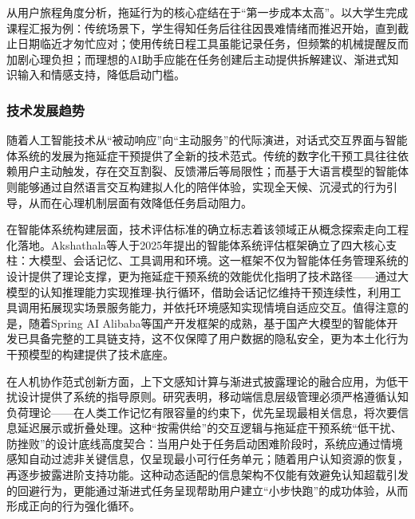 \par 从用户旅程角度分析，拖延行为的核心症结在于“第一步成本太高”\cite{klingsieck2013procrastination}。以大学生完成课程汇报为例：传统场景下，学生得知任务后往往因畏难情绪而推迟开始，直到截止日期临近才匆忙应对；使用传统日程工具虽能记录任务，但频繁的机械提醒反而加剧心理负担；而理想的AI助手应能在任务创建后主动提供拆解建议、渐进式知识输入和情感支持，降低启动门槛。

\subsubsection{技术发展趋势}

\par 随着人工智能技术从“被动响应”向“主动服务”的代际演进\cite{luo2025large}，对话式交互界面与智能体系统的发展为拖延症干预提供了全新的技术范式。传统的数字化干预工具往往依赖用户主动触发，存在交互割裂、反馈滞后等局限性；而基于大语言模型的智能体则能够通过自然语言交互构建拟人化的陪伴体验，实现全天候、沉浸式的行为引导，从而在心理机制层面有效降低任务启动阻力。

\par 在智能体系统构建层面，技术评估标准的确立标志着该领域正从概念探索走向工程化落地。Akshathala等人于2025年提出的智能体系统评估框架确立了四大核心支柱：大模型、会话记忆、工具调用和环境\cite{akshathala2025taskcompletionassessmentframework}。这一框架不仅为智能体任务管理系统的设计提供了理论支撑，更为拖延症干预系统的效能优化指明了技术路径——通过大模型的认知推理能力实现推理-执行循环\cite{yao2022react}，借助会话记忆维持干预连续性，利用工具调用拓展现实场景服务能力，并依托环境感知实现情境自适应交互。值得注意的是，随着Spring AI Alibaba\cite{spring_ai_alibaba}等国产开发框架的成熟，基于国产大模型\cite{liu2024deepseek}\cite{bai2023qwen}的智能体开发已具备完整的工具链支持，这不仅保障了用户数据的隐私安全，更为本土化行为干预模型的构建提供了技术底座。

\par 在人机协作范式创新方面，上下文感知计算与渐进式披露理论的融合应用，为低干扰设计提供了系统的指导原则。研究表明，移动端信息层级管理必须严格遵循认知负荷理论——在人类工作记忆有限容量的约束下，优先呈现最相关信息，将次要信息延迟展示或折叠处理\cite{sweller1988cognitive}。这种“按需供给”的交互逻辑与拖延症干预系统“低干扰、防挫败”的设计底线高度契合：当用户处于任务启动困难阶段时，系统应通过情境感知自动过滤非关键信息，仅呈现最小可行任务单元；随着用户认知资源的恢复，再逐步披露进阶支持功能。这种动态适配的信息架构不仅能有效避免认知超载引发的回避行为，更能通过渐进式任务呈现帮助用户建立“小步快跑”的成功体验，从而形成正向的行为强化循环。

